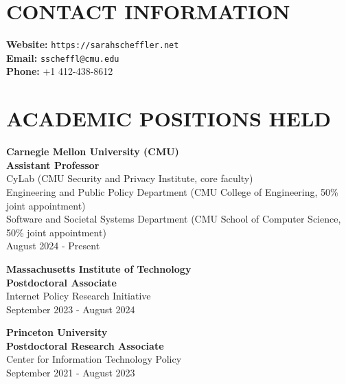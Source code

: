 \documentclass{res}
\begin{document}
 



                                  
\begin{resume}


\section{CONTACT INFORMATION}  
\vspace{0.1in}
\textbf{Website:} \texttt{https://sarahscheffler.net} \\
\textbf{Email:} \texttt{sscheffl@cmu.edu} \\
\textbf{Phone:} +1 412-438-8612

\vspace{-0.25in}
\section{ACADEMIC POSITIONS HELD}  
\vspace{0.1in}

\textbf{Carnegie Mellon University (CMU)} \\
\textbf{Assistant Professor} \\
CyLab (CMU Security and Privacy Institute, core faculty) \\
Engineering and Public Policy Department (CMU College of Engineering, 50\% joint appointment) \\
Software and Societal Systems Department (CMU School of Computer Science, 50\% joint appointment) \\
August 2024 - Present

\textbf{Massachusetts Institute of Technology} \\
\textbf{Postdoctoral Associate} \\
Internet Policy Research Initiative \\
September 2023 - August 2024

\textbf{Princeton University} \\
\textbf{Postdoctoral Research Associate} \\
Center for Information Technology Policy \\
September 2021 - August 2023




\end{resume}
\end{document}

